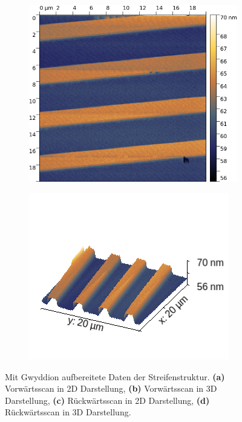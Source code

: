 \begin{figure}[H]
\begin{subfigure}{0.49\textwidth}
        \caption{}
    \end{subfigure}
    \begin{subfigure}{0.49\textwidth}
        \includegraphics[width=\textwidth]{bilder/Mikrostruktur/Streifen_Bac_2D.png}
        \caption{}
    \end{subfigure}
    \begin{subfigure}{0.49\textwidth}
        \includegraphics[width=\textwidth]{bilder/Mikrostruktur/Streifen_Bac_3D.png}
        \caption{}
    \end{subfigure}
    \caption{Mit Gwyddion aufbereitete Daten der Streifenstruktur. \textbf{(a)} Vorwärtsscan in 2D Darstellung, \textbf{(b)} Vorwärtsscan in 3D Darstellung, \textbf{(c)} Rückwärtsscan in 2D Darstellung, \textbf{(d)} Rückwärtsscan in 3D Darstellung.}
    \label{fig:Streifen}
\end{figure}


